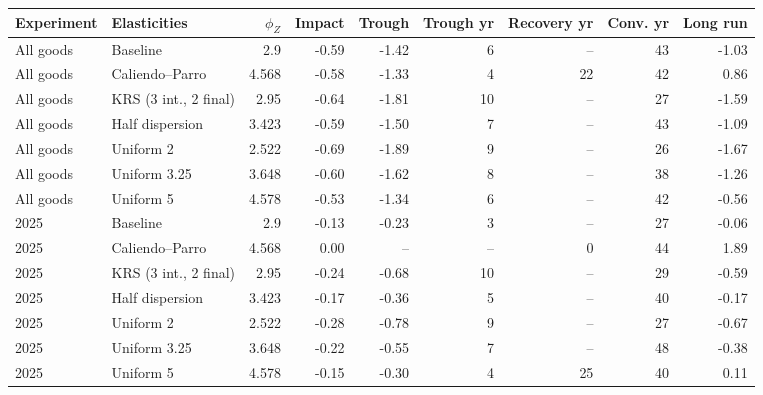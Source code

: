 \begin{tabular}{llrrrrrrr}
\toprule
Experiment & Elasticities & $\phi_Z$ & Impact & Trough & Trough yr & Recovery yr & Conv. yr & Long run \\
\midrule
All goods & Baseline & 2.9 & -0.59 & -1.42 & 6 & -- & 43 & -1.03 \\
All goods & Caliendo--Parro & 4.568 & -0.58 & -1.33 & 4 & 22 & 42 & 0.86 \\
All goods & KRS (3 int., 2 final) & 2.95 & -0.64 & -1.81 & 10 & -- & 27 & -1.59 \\
All goods & Half dispersion & 3.423 & -0.59 & -1.50 & 7 & -- & 43 & -1.09 \\
All goods & Uniform 2 & 2.522 & -0.69 & -1.89 & 9 & -- & 26 & -1.67 \\
All goods & Uniform 3.25 & 3.648 & -0.60 & -1.62 & 8 & -- & 38 & -1.26 \\
All goods & Uniform 5 & 4.578 & -0.53 & -1.34 & 6 & -- & 42 & -0.56 \\
\midrule
2025 & Baseline & 2.9 & -0.13 & -0.23 & 3 & -- & 27 & -0.06 \\
2025 & Caliendo--Parro & 4.568 & 0.00 & -- & -- & 0 & 44 & 1.89 \\
2025 & KRS (3 int., 2 final) & 2.95 & -0.24 & -0.68 & 10 & -- & 29 & -0.59 \\
2025 & Half dispersion & 3.423 & -0.17 & -0.36 & 5 & -- & 40 & -0.17 \\
2025 & Uniform 2 & 2.522 & -0.28 & -0.78 & 9 & -- & 27 & -0.67 \\
2025 & Uniform 3.25 & 3.648 & -0.22 & -0.55 & 7 & -- & 48 & -0.38 \\
2025 & Uniform 5 & 4.578 & -0.15 & -0.30 & 4 & 25 & 40 & 0.11 \\
\bottomrule
\end{tabular}
